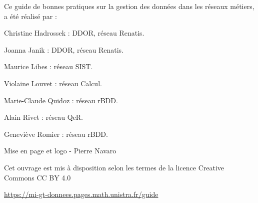 \vspace*{\fill}
\begingroup

Ce guide de bonnes pratiques sur la gestion des données dans les réseaux métiers, a été réalisé par  :

\begin{list}{-}{}
\item Christine Hadrossek : DDOR, réseau Renatis.
\item Joanna Janik : DDOR, réseau Renatis.
\item Maurice Libes : réseau SIST.
\item Violaine Louvet : réseau Calcul.
\item Marie-Claude Quidoz : réseau rBDD.
\item Alain Rivet : réseau QeR.
\item Geneviève Romier : réseau rBDD.
\end{list}

Mise en page et logo - Pierre Navaro

Cet ouvrage est mis à disposition selon les termes de la licence Creative Commons CC BY 4.0 \ccby

\url{https://mi-gt-donnees.pages.math.unistra.fr/guide}

\endgroup

\vspace*{\fill}
\clearpage
